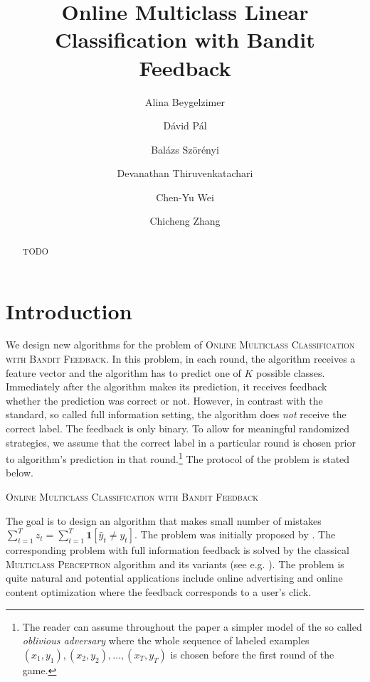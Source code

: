 \documentclass[12pt]{article}
\title{Online Multiclass Linear Classification with Bandit Feedback}
\author{
Alina Beygelzimer \and
D\'avid P\'al \and
Bal\'azs Sz\"or\'enyi \and
Devanathan Thiruvenkatachari \and
Chen-Yu Wei \and
Chicheng Zhang
}
\newcommand{\indicator}[1]{\mathbf{1}\left[#1 \right]} %
\begin{document}
\maketitle

\begin{abstract}
TODO
\end{abstract}

\section{Introduction}
\label{section:introduction}

We design new algorithms for the problem of \textsc{Online Multiclass
Classification with Bandit Feedback}. In this problem, in each round, the
algorithm receives a feature vector and the algorithm has to predict one of $K$
possible classes. Immediately after the algorithm makes its prediction, it
receives feedback whether the prediction was correct or not. However, in
contrast with the standard, so called full information setting, the algorithm
does \emph{not} receive the correct label. The feedback is only binary. To allow
for meaningful randomized strategies, we assume that the correct label in a
particular round is chosen prior to algorithm's prediction in that
round.\footnote{The reader can assume throughout the paper a simpler model of
the so called \emph{oblivious adversary} where the whole sequence of labeled
examples $(x_1, y_1), (x_2, y_2), \dots, (x_T, y_T)$ is chosen before the first
round of the game.} The protocol of the problem is stated below.

\begin{algorithm}[h]
\caption{\textsc{Online Multiclass Classification with Bandit Feedback}
\label{algorithm:game-protocol}}
\begin{algorithmic}[1]
{
\ENDFOR
}
\end{algorithmic}
\end{algorithm}

The goal is to design an algorithm that makes small number of mistakes
$\sum_{t=1}^T z_t = \sum_{t=1}^T \indicator{\widehat y_t \neq y_t}$. The problem
was initially proposed by \cite{Kakade-Shalev-Shwartz-Tewari-2008}. The
corresponding problem with full information feedback is solved by the classical
\textsc{Multiclass Perceptron} algorithm and its variants (see e.g.
\cite{Crammer-Dekel-Keshet-Shalev-Shwartz-Singer-2006}). The problem is quite
natural and potential applications include online advertising and online content
optimization where the feedback corresponds to a user's click.
\end{document}
